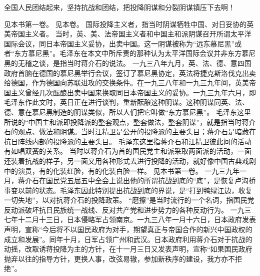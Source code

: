 全国人民团结起来，坚持抗战和团结，把投降阴谋和分裂阴谋镇压下去啊！


\begin{maonote}
见本书第一卷。
见本卷。
国际投降主义者，指当时阴谋牺牲中国、对日妥协的英美帝国主义者。
当时，英、美、法帝国主义者和中国主和派阴谋召开所谓太平洋国际会议，同日本帝国主义妥协，出卖中国。这一阴谋被称为“远东慕尼黑”或者“东方慕尼黑”。毛泽东在本文中所斥责的那种认为太平洋国际会议并非东方慕尼黑的无稽之谈，是指当时蒋介石的说法。
一九三八年九月，英、法、德、意四国政府首脑在德国的慕尼黑举行会议，签订了慕尼黑协定，英法将捷克斯洛伐克出卖给德国，作为德国向苏联进攻的交换条件。在一九三八年和一九三九年间，英美帝国主义曾经几次酝酿出卖中国来换取同日本帝国主义的妥协。一九三九年六月，即毛泽东作此文时，英日正在进行谈判，重新酝酿这种阴谋。这种阴谋同英、法、德、意在慕尼黑制造的阴谋类似，所以人们把它叫做“东方慕尼黑”。
毛泽东这里所说的“中国主和派即投降派的整套观点，整套做法，整套阴谋”，就是指当时蒋介石的观点、做法和阴谋。当时汪精卫是公开的投降派的主要头目；蒋介石是暗藏在抗日阵线内部的投降派的主要头目。
毛泽东这里指蒋介石和汪精卫彼此间的活动有如唱双簧的关系。
当时以蒋介石为首的国民党主和派采取两面派的活动，一面还装着抗战的样子，另一面又用各种形式去进行投降的活动，就好像中国古典戏剧中的演员，有的化装红脸，有的化装白脸一样。
见本书第一卷。
一九三九年一月，蒋介石在国民党五届五中全会上说出他的所谓抗战到底的“底”，是恢复卢沟桥事变以前的状态。毛泽东因此特别提出抗战到底的界说，是“打到鸭绿江边，收复一切失地”，以对抗蒋介石的投降政策。
“磨擦”是当时流行的一个名词，指国民党反动派破坏抗日民族统一战线、反对共产党和进步势力的各种反动行为。
一九三七年十二月十三日，日本侵略军占领南京。一九三八年一月十六日，日本政府发表声明，宣称“今后将不以国民政府为对手，期望真正与帝国合作的新兴中国政权的成立和发展”。同年十月，日军占领广州和武汉。日本政府利用蒋介石对于抗战的动摇，改取诱蒋投降为主的方针，在十一月三日又发表声明，宣称“如果国民政府抛弃以往的指导方针，更换人事，改弦易辙，参加新秩序的建设，我方亦不拒绝”。
\end{maonote}
